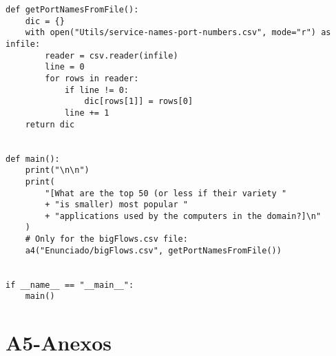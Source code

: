 \begin{lstlisting}
def getPortNamesFromFile():
    dic = {}
    with open("Utils/service-names-port-numbers.csv", mode="r") as infile:
        reader = csv.reader(infile)
        line = 0
        for rows in reader:
            if line != 0:
                dic[rows[1]] = rows[0]
            line += 1
    return dic


def main():
    print("\n\n")
    print(
        "[What are the top 50 (or less if their variety "
        + "is smaller) most popular "
        + "applications used by the computers in the domain?]\n"
    )
    # Only for the bigFlows.csv file:
    a4("Enunciado/bigFlows.csv", getPortNamesFromFile())


if __name__ == "__main__":
    main()

\end{lstlisting}

\chapter{A5-Anexos}
